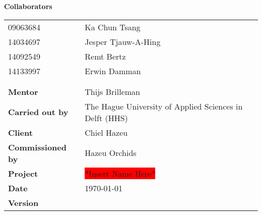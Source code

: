\begin{titlepage}
		
	\begin{center}
		\LARGE{\textbf{\thistitle}}
	\end{center}
	
	\begin{figure}[h]
	\end{figure}
	
	\bigskip
	\textbf{Collaborators}
	\begin{table}[h]
		\begin{tabular}{@{}ll@{}}
			09063684                 & Ka Chun Tsang                                           \\
			14034697                 & Jesper Tjauw-A-Hing                           		               \\
			14092549                 & Remt Bertz                	                           \\
			14133997                 & Erwin Damman                                            \\
			                         &              										   \\
			                         &              										   \\
			\textbf{Mentor}          & Thijs Brilleman                                         \\
			\textbf{Carried out by}  & The Hague University of Applied Sciences in Delft (HHS) \\
			\textbf{Client}          & Chiel Hazeu                                             \\
			\textbf{Commissioned by} & Hazeu Orchids                                           \\
			\textbf{Project}         & \colorbox{red}{*Insert Name Here*}                      \\
			\textbf{Date}            & \today                                                  \\
			\textbf{Version}         & \version          									   \\
		\end{tabular}
	\end{table}
\end{titlepage}


